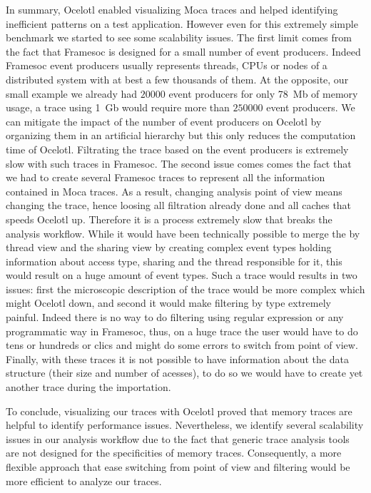 In summary, \gls{Ocelotl} enabled visualizing \gls{Moca} traces and helped identifying inefficient patterns on a test application.
However even for this extremely simple benchmark we started to see some scalability issues.
The first limit comes from the fact that \gls{Framesoc} is designed for a small number of event producers.
Indeed \gls{Framesoc} event producers usually represents threads, \glspl{CPU} or nodes of a distributed system with at best a few thousands of them.
At the opposite, our small example we already had $20000$ event producers for only \SI{78}{Mb} of memory usage, a trace using \SI{1}{Gb} would require more than $250000$ event producers.
We can mitigate the impact of the number of event producers on \gls{Ocelotl} by organizing them in an artificial hierarchy but this only reduces the computation time of \gls{Ocelotl}.
Filtrating the trace based on the event producers is extremely slow with such traces in \gls{Framesoc}.
The second issue comes comes the fact that we had to create several \gls{Framesoc} traces to represent all the information contained in \gls{Moca} traces.
As a result, changing analysis point of view means changing the trace, hence loosing all filtration already done and all caches that speeds \gls{Ocelotl} up.
Therefore it is a process extremely slow that breaks the analysis workflow.
While it would have been technically possible to merge the by thread view and the sharing view by creating complex event types holding information about access type, sharing and the thread responsible for it, this would result on a huge amount of event types.
Such a trace would results in two issues: first the microscopic description of the trace would be more complex which might \gls{Ocelotl} down,
and second it would make filtering by type extremely painful.
Indeed there is no way to do filtering using regular expression or any programmatic way in \gls{Framesoc}, thus, on a huge trace the user would have to do tens or hundreds or clics and might do some errors to switch from point of view.
Finally, with these traces it is not possible to have information about the data structure (their size and number of acesses), to do so we would have to create yet another trace during the importation.

To conclude, visualizing our traces with \gls{Ocelotl} proved that memory traces are helpful to identify performance issues.
Nevertheless, we identify several scalability issues in our analysis workflow due to the fact that generic trace analysis tools are not designed for the specificities of memory traces.
Consequently, a more flexible approach that ease switching from point of view and filtering would be more efficient to analyze our traces.

